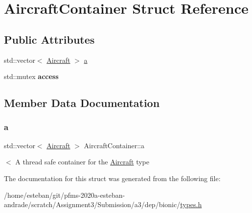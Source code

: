 \hypertarget{structAircraftContainer}{}\section{Aircraft\+Container Struct Reference}
\label{structAircraftContainer}
\subsection*{Public Attributes}
\begin{DoxyCompactItemize}
\item 
std\+::vector$<$ \hyperlink{structAircraft}{Aircraft} $>$ \hyperlink{structAircraftContainer_ab1ed617d005237d8c49d5acae8174424}{a}
\item 
\mbox{\label{structAircraftContainer_a0c52481859d8864b461224958c339533}} 
std\+::mutex {\bfseries access}
\end{DoxyCompactItemize}


\subsection{Member Data Documentation}
\mbox{\label{structAircraftContainer_ab1ed617d005237d8c49d5acae8174424}} 
\subsubsection{\texorpdfstring{a}{a}}
{\footnotesize\ttfamily std\+::vector$<$ \hyperlink{structAircraft}{Aircraft} $>$ Aircraft\+Container\+::a}

$<$ A thread safe container for the \hyperlink{structAircraft}{Aircraft} type 

The documentation for this struct was generated from the following file\+:\begin{DoxyCompactItemize}
\item 
/home/esteban/git/pfms-\/2020a-\/esteban-\/andrade/scratch/\+Assignment3/\+Submission/a3/dep/bionic/\hyperlink{bionic_2types_8h}{types.\+h}\end{DoxyCompactItemize}
